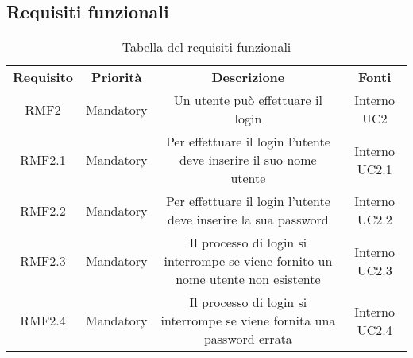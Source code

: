\subsection{Requisiti funzionali}
	
	\begin{table} [h!]
		\caption{Tabella del requisiti funzionali}
		\begin{center}
			\renewcommand{\arraystretch}{4}
			\begin{tabular} { c c c c}
				\rowcolor{lightgray}
				\textbf{Requisito} & \textbf{Priorità} & \textbf{Descrizione}  & \textbf{Fonti} \\
				RMF2   & Mandatory & Un utente può effettuare il login & Interno UC2 \\
				RMF2.1 & Mandatory & Per effettuare il login l'utente deve inserire il suo nome utente & Interno UC2.1 \\
				RMF2.2 & Mandatory & Per effettuare il login l'utente deve inserire la sua password & Interno UC2.2 \\
				RMF2.3 & Mandatory & Il processo di login si interrompe se viene fornito un nome utente non esistente & Interno UC2.3 \\
				RMF2.4 & Mandatory & Il processo di login si interrompe se viene fornita una password errata & Interno UC2.4 \\
				
			\end{tabular}
		
	\end{center}
\end{table}

